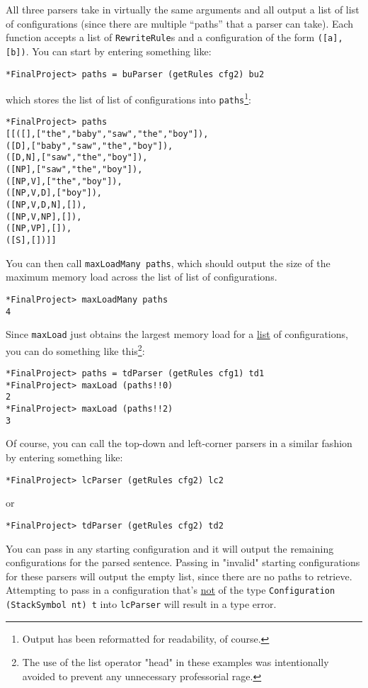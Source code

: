 \documentclass[12pt, letterpaper]{article}
\begin{document}
All three parsers take in virtually the same arguments and all output a list of list of configurations (since there are multiple “paths” that a parser can take). Each function accepts a list of \verb|RewriteRule|s and a configuration of the form \verb|([a], [b])|. You can start by entering something like:
\\
\begin{lstlisting}[frame=single]
*FinalProject> paths = buParser (getRules cfg2) bu2  
\end{lstlisting} which stores the list of list of configurations into \verb|paths|\footnote[1]{Output has been reformatted for readability, of course.}: 
\begin{lstlisting}[frame=single]
*FinalProject> paths 
[[([],["the","baby","saw","the","boy"]),
([D],["baby","saw","the","boy"]),
([D,N],["saw","the","boy"]),
([NP],["saw","the","boy"]),
([NP,V],["the","boy"]),
([NP,V,D],["boy"]),
([NP,V,D,N],[]),
([NP,V,NP],[]),
([NP,VP],[]),
([S],[])]]
\end{lstlisting}
You can then call \verb|maxLoadMany paths|, which should output the size of the maximum memory load across the list of list of configurations. 

\begin{lstlisting}[frame=single]
*FinalProject> maxLoadMany paths
4
\end{lstlisting}

Since \verb|maxLoad| just obtains the largest memory load for a \underline{list} of configurations, you can do something like this\footnote[2]{The use of the list operator "head" in these examples was intentionally avoided to prevent any unnecessary professorial rage.}: 

\begin{lstlisting}[frame=single]
*FinalProject> paths = tdParser (getRules cfg1) td1
*FinalProject> maxLoad (paths!!0)
2
*FinalProject> maxLoad (paths!!2)
3
\end{lstlisting}

Of course, you can call the top-down and left-corner parsers in a similar fashion by entering something like: 
\begin{lstlisting}[frame=single]
*FinalProject> lcParser (getRules cfg2) lc2
\end{lstlisting}
or 
\begin{lstlisting}[frame=single]
*FinalProject> tdParser (getRules cfg2) td2
\end{lstlisting}


You can pass in any starting configuration and it will output the remaining configurations for the parsed sentence. Passing in "invalid" starting configurations for these parsers will output the empty list, since there are no paths to retrieve. Attempting to pass in a configuration that's \underline{not} of the type \verb|Configuration (StackSymbol nt) t| into \verb|lcParser| will result in a type error.  
\end{document}
